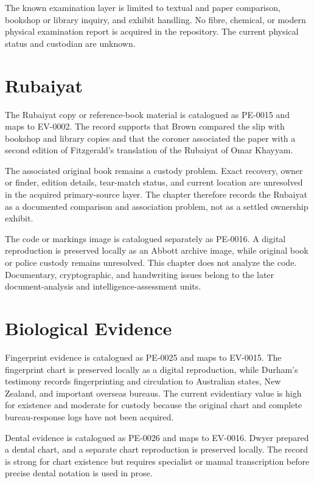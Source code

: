 The known examination layer is limited to textual and paper comparison, bookshop or library inquiry, and exhibit handling. No fibre, chemical, or modern physical examination report is acquired in the repository. The current physical status and custodian are unknown.

\section{Rubaiyat}

The Rubaiyat copy or reference-book material is catalogued as PE-0015 and maps to EV-0002. The record supports that Brown compared the slip with bookshop and library copies and that the coroner associated the paper with a second edition of Fitzgerald's translation of the Rubaiyat of Omar Khayyam.

The associated original book remains a custody problem. Exact recovery, owner or finder, edition details, tear-match status, and current location are unresolved in the acquired primary-source layer. The chapter therefore records the Rubaiyat as a documented comparison and association problem, not as a settled ownership exhibit.

The code or markings image is catalogued separately as PE-0016. A digital reproduction is preserved locally as an Abbott archive image, while original book or police custody remains unresolved. This chapter does not analyze the code. Documentary, cryptographic, and handwriting issues belong to the later document-analysis and intelligence-assessment units.

\section{Biological Evidence}

Fingerprint evidence is catalogued as PE-0025 and maps to EV-0015. The fingerprint chart is preserved locally as a digital reproduction, while Durham's testimony records fingerprinting and circulation to Australian states, New Zealand, and important overseas bureaus. The current evidentiary value is high for existence and moderate for custody because the original chart and complete bureau-response logs have not been acquired.

Dental evidence is catalogued as PE-0026 and maps to EV-0016. Dwyer prepared a dental chart, and a separate chart reproduction is preserved locally. The record is strong for chart existence but requires specialist or manual transcription before precise dental notation is used in prose.

